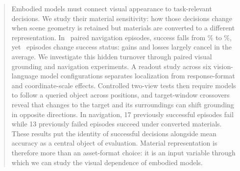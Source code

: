 \begin{abstract}
Embodied models must connect visual appearance to task-relevant decisions.
We study their material sensitivity: how those decisions change when scene
geometry is retained but materials are converted to a different representation. In \NavN\ paired navigation episodes, success falls from
\NavSrOriginal\% to \NavSrConverted\%, yet \NavFlips\ episodes change success
status: gains and losses largely cancel in the average. We investigate this
hidden turnover through paired visual grounding and navigation experiments.
A readout study across six vision-language model configurations separates
localization from response-format and coordinate-scale effects. Controlled
two-view tests then require models to follow a queried object across positions,
and target-window crossovers reveal that changes to the target and its
surroundings can shift grounding in opposite directions. In navigation,
17 previously successful episodes fail while 13 previously failed episodes
succeed under converted materials. These results put the identity of successful
decisions alongside mean accuracy as a central object of evaluation. Material
representation is therefore more than an asset-format choice: it is an input
variable through which we can study the visual dependence of embodied models.
\end{abstract}
